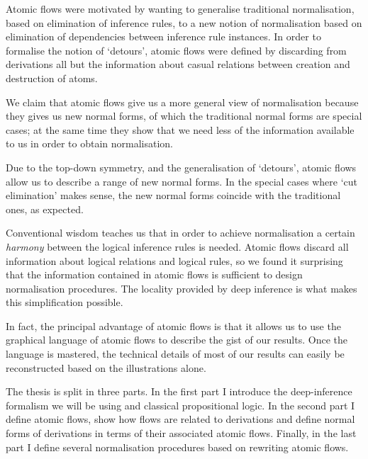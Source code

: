 Atomic flows were motivated by wanting to generalise traditional normalisation, based on elimination of inference rules, to a new notion of normalisation based on elimination of dependencies between inference rule instances. In order to formalise the notion of `detours', atomic flows were defined by discarding from derivations all but the information about casual relations between creation and destruction of atoms.

We claim that atomic flows give us a more general view of normalisation because they gives us new normal forms, of which the traditional normal forms are special cases; at the same time they show that we need less of the information available to us in order to obtain normalisation.

Due to the top-down symmetry, and the generalisation of `detours', atomic flows allow us to describe a range of new normal forms. In the special cases where `cut elimination' makes sense, the new normal forms coincide with the traditional ones, as expected.

Conventional wisdom teaches us that in order to achieve normalisation a certain \emph{harmony} between the logical inference rules is needed. Atomic flows discard all information about logical relations and logical rules, so we found it surprising that the information contained in atomic flows is sufficient to design normalisation procedures. The locality provided by deep inference is what makes this simplification possible.

In fact, the principal advantage of atomic flows is that it allows us to use the graphical language of atomic flows to describe the gist of our results. Once the language is mastered, the technical details of most of our results can easily be reconstructed based on the illustrations alone.

The thesis is split in three parts. In the first part I introduce the deep-inference formalism we will be using and classical propositional logic. In the second part I define atomic flows, show how flows are related to derivations and define normal forms of derivations in terms of their associated atomic flows. Finally, in the last part I define several normalisation procedures based on rewriting atomic flows.